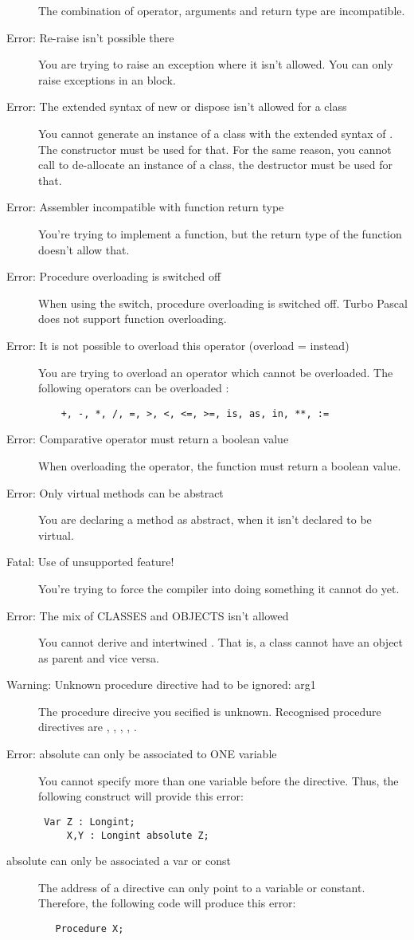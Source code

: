 \begin{description}
 The combination of operator, arguments and return type are
 incompatible.
\item [Error: Re-raise isn't possible there]
 You are trying to raise an exception where it isn't allowed. You can only
 raise exceptions in an  block.
\item [Error: The extended syntax of new or dispose isn't allowed for a class]
 You cannot generate an instance of a class with the extended syntax of
 . The constructor must be used for that. For the same reason, you
 cannot call  to de-allocate an instance of a class, the
 destructor must be used for that.
\item [Error: Assembler incompatible with function return type]
 You're trying to implement a  function, but the return type
 of the function doesn't allow that.
\item [Error: Procedure overloading is switched off]
 When using the  switch, procedure overloading is switched off.
 Turbo Pascal does not support function overloading.
\item [Error: It is not possible to overload this operator (overload = instead)]
 You are trying to overload an operator which cannot be overloaded.
 The following operators can be overloaded :
 \begin{verbatim}
    +, -, *, /, =, >, <, <=, >=, is, as, in, **, :=
 \end{verbatim}
\item [Error: Comparative operator must return a boolean value]
 When overloading the \var{=} operator, the function must return a boolean
 value.
\item [Error: Only virtual methods can be abstract]
 You are declaring a method as abstract, when it isn't declared to be
 virtual.
\item [Fatal: Use of unsupported feature!]
 You're trying to force the compiler into doing something it cannot do yet.
\item [Error: The mix of CLASSES and OBJECTS isn't allowed]
 You cannot derive  and  intertwined . That is,
 a class cannot have an object as parent and vice versa.
\item [Warning: Unknown procedure directive had to be ignored: arg1]
 The procedure direcive you secified is unknown. Recognised procedure
 directives are , , , 
 , .
\item [Error: absolute can only be associated to ONE variable]
 You cannot specify more than one variable before the  directive.
 Thus, the following construct will provide this error:
 \begin{verbatim}
 Var Z : Longint;
     X,Y : Longint absolute Z;
 \end{verbatim}
 \item [ absolute can only be associated a var or const ]
 The address of a  directive can only point to a variable or
 constant. Therefore, the following code will produce this error:
 \begin{verbatim}
   Procedure X;


\end{verbatim}
\end{description}
